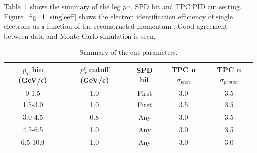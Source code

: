 {Table~\ref{table_4_cutset} shows the summary of the leg $p_{\rm{T}}$, SPD hit and TPC PID cut setting.
Figure~\ref{fig_4_singleeff} shows the electron identification efficiency of single electrons as a function of the reconstructed momentum . 
Good agreement between data and Monte-Carlo simulation is seen. 
\begin{table}[!h]
  \centering
    \begin{tabular}{ccccc} \hline
      $p_{T}$ bin (GeV/c)  & $p^{e}_{T}$ cutoff (GeV/c) & SPD hit & TPC n$\sigma_{pion}$ & TPC n$\sigma_{proton}$\\ \hline
      0-1.5                &  1.0  & First   &     3.0                           & 3.5                                      \\ 
      1.5-3.0              & 1.0  & First   &     3.5                          & 3.5                                      \\ 
      3.0-4.5              & 0.8  & Any     &     3.0                           & 3.5                                      \\ 
      4.5-6.5              & 1.0  & Any     &     3.0                           & 3.5                                      \\ 
      6.5-10.0             & 1.0  & Any     &     3.0                           & 3.0                                      \\  \hline
    \end{tabular}
    \caption{Summary of the cut parameters.}
    	\label{table_4_cutset}
\end{table}

}
